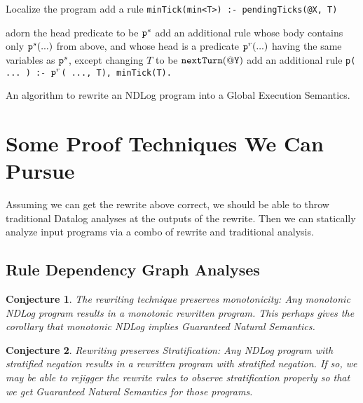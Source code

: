 \documentclass{article}
\newtheorem{conjecture}{Conjecture}
\begin{document}
\begin{algorithm}[H]
\SetLine
{}


Localize the program\;
add a rule {\tt minTick(min<T>) :- pendingTicks(@X, T)}\;

 {
}
 {
  adorn the head predicate to be $\mbox{\tt p}^s$\;
  add an additional rule whose body contains only $\mbox{\tt p}^s( ... )$ from above, 
      and whose head is a predicate $\mbox{\tt p}^r( ... )$ having the same
      variables as ${\tt p}^s$, except changing $T$ to be ${\tt nextTurn(@Y)}$ \;
  add an additional rule {\tt p( ... ) :- $\mbox{\tt p}^r$( ..., T), minTick(T).}
}
    
\caption{An algorithm to rewrite an NDLog program into a Global
  Execution Semantics.}
\end{algorithm}
\section{Some Proof Techniques We Can Pursue}
Assuming we can get the rewrite above correct, we should be able to
throw traditional Datalog analyses at the outputs of the rewrite.
Then we can statically analyze input programs via a combo of rewrite
and traditional analysis.

\subsection{Rule Dependency Graph Analyses}
\begin{conjecture} {\em The rewriting technique preserves monotonicity:} Any
  monotonic NDLog program results in a monotonic 
  rewritten program.  This perhaps gives the corollary that monotonic
  NDLog implies Guaranteed Natural Semantics.
\end{conjecture}
\begin{conjecture} {\em Rewriting preserves Stratification:} Any
  NDLog program with stratified negation results in a rewritten
  program with stratified negation.  If so, we may be able to
  rejigger the rewrite rules to observe stratification properly so
  that we get Guaranteed Natural Semantics for those programs.
\end{conjecture}
\end{document}
